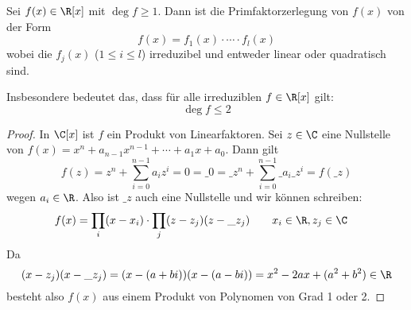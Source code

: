 \documentclass[a4paper, 10pt]{scrbook}
\begin{document}
\begin{prop}
	\label{prop:13.22}
	Sei $f(x)\in \R[x]$ mit $\deg f \ge 1$.
	Dann ist die Primfaktorzerlegung von $f(x)$ von der Form
	\[
		f(x) = f_1(x) \cdot \dotsb \cdot f_l(x)
	\]
	wobei die $f_j(x)$ ($1\le i\le l$) irreduzibel und entweder linear oder quadratisch sind.
	\begin{note}
		Insbesondere bedeutet das, dass für alle irreduziblen $f \in \R[x]$ gilt:
		\[
			\deg f \le 2
		\]
	\end{note}
	\begin{proof}
		In $\C[x]$ ist $f$ ein Produkt von Linearfaktoren.
		Sei $z\in \C$ eine Nullstelle von $f(x) = x^n + a_{n-1}x^{n-1} + \dotsb + a_1x + a_0$.
		Dann gilt
		\[
			f(z) = z^n + \sum_{i=0}^{n-1}a_iz^i = 0 = \_0 = \_z^n + \sum_{i=0}^{n-1}\_{a_i}\_z^i = f(\_z)
		\]
		wegen $a_i\in \R$.
		Also ist $\_z$ auch eine Nullstelle und wir können schreiben:
		\begin{align*}
			f(x) &= \prod_{i}(x-x_i)\cdot \prod_{j}(z-z_j)(z-\_z_j) \qquad x_i\in \R, z_j\in \C
		\end{align*}
		Da
		\[
			(x-z_j)(x-\_z_j) = (x-(a+bi))(x-(a-bi)) = x^2 - 2ax + (a^2+b^2) \in \R
		\]
		besteht also $f(x)$ aus einem Produkt von Polynomen von Grad 1 oder 2.
	\end{proof}
\end{prop}
\end{document}
